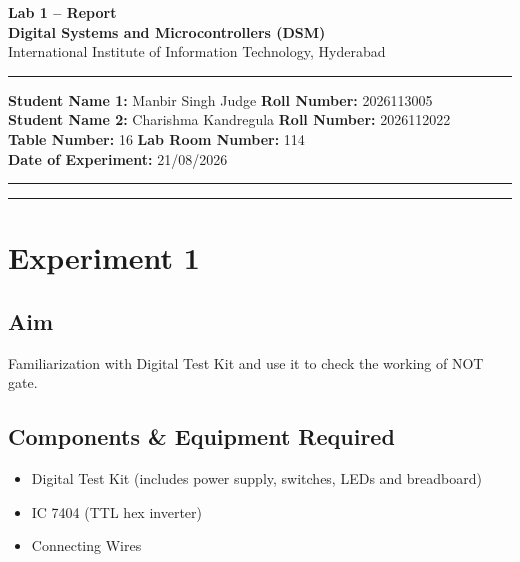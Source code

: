 \documentclass[11pt, a4paper]{article}
\begin{document}
\begin{center}
    {\Large \textbf{Lab 1 -- Report}} \\[0.2cm]
    {\large \textbf{Digital Systems and Microcontrollers (DSM)}} \\[0.1cm]
    {\normalsize International Institute of Information Technology, Hyderabad} \\[0.3cm]
\end{center}

\vspace{0.2cm}
\hrule
\vspace{0.4cm}

\noindent \textbf{Student Name 1:} Manbir Singh Judge \hfill \textbf{Roll Number:} 2026113005 \\
\noindent \textbf{Student Name 2:} Charishma Kandregula \hfill \textbf{Roll Number:} 2026112022 \\
\noindent \textbf{Table Number:} 16 \hfill \textbf{Lab Room Number:} 114 \\
\noindent \textbf{Date of Experiment:} 21/08/2026

\vspace{0.4cm}
\hrule
\vspace{0.5cm}

\vspace{1em}

\tableofcontents
\vspace{0.5cm}
\hrule
\vspace{0.8cm}

\newpage


\section{Experiment 1}

\subsection{Aim}
Familiarization with Digital Test Kit and use it to check the working of NOT gate.

\subsection{Components \& Equipment Required}
\begin{itemize}
    \item Digital Test Kit (includes power supply, switches, LEDs and breadboard)
    \item IC 7404 (TTL hex inverter)
    \item Connecting Wires
\end{itemize}
\end{document}
